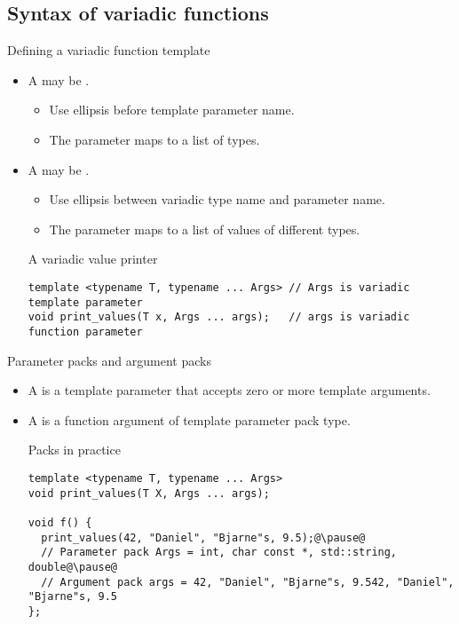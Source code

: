 \subsection{Syntax of variadic functions}

\begin{frame}[t,fragile]{Defining a variadic function template}
\begin{itemize}
  \item A  may be .
    \begin{itemize}
      \item Use ellipsis before template parameter name.
      \item The parameter maps to a list of types.
    \end{itemize}

  \item A  may be .
    \begin{itemize}
      \item Use ellipsis between variadic type name and parameter name.
      \item The parameter maps to a list of values of different types.
    \end{itemize}

\begin{block}{A variadic value printer}
\begin{lstlisting}
template <typename T, typename ... Args> // Args is variadic template parameter
void print_values(T x, Args ... args);   // args is variadic function parameter
\end{lstlisting}
\end{block}

\end{itemize}
\end{frame}

\begin{frame}[t,fragile]{Parameter packs and argument packs}
\begin{itemize}
  \item A  is a template parameter that
        accepts zero or more template arguments.

  \pause
  \item A  is a function argument of
        template parameter pack type.

\pause
\begin{block}{Packs in practice}
\begin{lstlisting}[escapechar=@]
template <typename T, typename ... Args>
void print_values(T X, Args ... args);

void f() {
  print_values(42, "Daniel", "Bjarne"s, 9.5);@\pause@
  // Parameter pack Args = int, char const *, std::string, double@\pause@
  // Argument pack args = 42, "Daniel", "Bjarne"s, 9.542, "Daniel", "Bjarne"s, 9.5
};
\end{lstlisting}
\end{block}
\end{itemize}
\end{frame}

